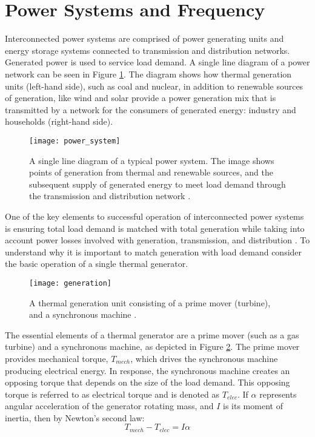 \section{Power Systems and Frequency}
Interconnected power systems are comprised of power generating units and energy storage systems connected to transmission and distribution networks. Generated power is used to service load demand. A single line diagram of a power network can be seen in Figure \ref{fig:generation}. The diagram shows how thermal generation units (left-hand side), such as coal and nuclear, in addition to renewable sources of generation, like wind and solar provide a power generation mix that is transmitted by a network for the consumers of generated energy: industry and households (right-hand side).
\begin{figure}[ht]
	\centering
	\texttt{[image: power\_system]}
	\caption{A single line diagram of a typical power system. The image shows points of generation from thermal and renewable sources, and the subsequent supply of generated energy to meet load demand through the transmission and distribution network \cite{Glavic2019}.}
	\label{fig:generation}
\end{figure}

One of the key elements to successful operation of interconnected power systems is ensuring total load demand is matched with total generation while taking into account power losses involved with generation, transmission, and distribution \cite{Wood2013}. To understand why it is important to match generation with load demand consider the basic operation of a single thermal generator. 
\begin{figure}[h]
	\centering
	\texttt{[image: generation]}
	\caption{A thermal generation unit consisting of a prime mover (turbine), and a synchronous machine \cite{Wood2013}.}
	\label{fig:turbine}
\end{figure}

The essential elements of a thermal generator are a prime mover (such as a gas turbine) and a synchronous machine, as depicted in Figure \ref{fig:turbine}. The prime mover provides mechanical torque, $T_{mech}$, which drives the synchronous machine producing electrical energy. In response, the synchronous machine creates an opposing torque that depends on the size of the load demand. This opposing torque is referred to as electrical torque and is denoted as $T_{elec}$. If $\alpha$ represents angular acceleration of the generator rotating mass, and $I$ is its moment of inertia, then by Newton's second law:
\begin{equation}
	T_{mech} - T_{elec} = I \alpha \label{eq:1}
\end{equation}

